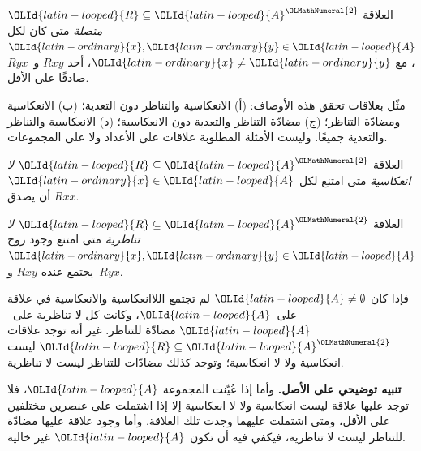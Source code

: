 \documentclass[../../../include/open-logic-section]{subfiles}
\begin{document}
\begin{defn}[الاتصالية]
العلاقة ${\OLId{latin-looped}{R}} \subseteq {\OLId{latin-looped}{A}}^{\OLMathNumeral{2}}$ \emph{متصلة} متى كان لكل ${\OLId{latin-ordinary}{x}},{\OLId{latin-ordinary}{y}}\in
{\OLId{latin-looped}{A}}$، مع ${\OLId{latin-ordinary}{x}} \neq {\OLId{latin-ordinary}{y}}$، أحد $Rxy$ و~$Ryx$ صادقًا على الأقل.
\end{defn}

\begin{prob}
مثّل بعلاقات تحقق هذه الأوصاف: (أ) الانعكاسية والتناظر دون التعدية؛
(ب) الانعكاسية ومضادّة التناظر؛ (ج) مضادّة التناظر والتعدية دون
الانعكاسية؛ (د) الانعكاسية والتناظر والتعدية جميعًا. وليست الأمثلة
المطلوبة علاقات على الأعداد ولا على المجموعات.
\end{prob}

\begin{defn}[اللاانعكاسية]
العلاقة ${\OLId{latin-looped}{R}} \subseteq {\OLId{latin-looped}{A}}^{\OLMathNumeral{2}}$ \emph{لا انعكاسية} متى امتنع لكل ${\OLId{latin-ordinary}{x}} \in
{\OLId{latin-looped}{A}}$ أن يصدق $Rxx$.
\end{defn}

\begin{defn}[اللاتناظرية]
العلاقة ${\OLId{latin-looped}{R}} \subseteq {\OLId{latin-looped}{A}}^{\OLMathNumeral{2}}$ \emph{لا تناظرية} متى امتنع وجود زوج
${\OLId{latin-ordinary}{x}},{\OLId{latin-ordinary}{y}}\in {\OLId{latin-looped}{A}}$ يجتمع عنده $Rxy$ و~$Ryx$.
\end{defn}

فإذا كان ${\OLId{latin-looped}{A}} \neq \emptyset$ لم تجتمع اللاانعكاسية والانعكاسية في
علاقة على~${\OLId{latin-looped}{A}}$، وكانت كل لا تناظرية على~${\OLId{latin-looped}{A}}$ مضادّة للتناظر.
غير أنه توجد علاقات ${\OLId{latin-looped}{R}} \subseteq {\OLId{latin-looped}{A}}^{\OLMathNumeral{2}}$ ليست انعكاسية ولا لا انعكاسية؛
وتوجد كذلك مضادّات للتناظر ليست لا تناظرية.

\textbf{تنبيه توضيحي على الأصل.} وأما إذا عُيّنت المجموعة ${\OLId{latin-looped}{A}}$، فلا توجد
عليها علاقة ليست انعكاسية ولا لا انعكاسية إلا إذا اشتملت على عنصرين
مختلفين على الأقل، ومتى اشتملت عليهما وجدت تلك العلاقة. وأما وجود
علاقة عليها مضادّة للتناظر ليست لا تناظرية، فيكفي فيه أن تكون ${\OLId{latin-looped}{A}}$ غير خالية.
\end{document}
